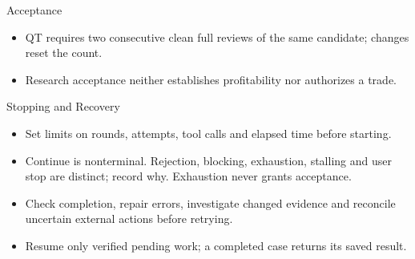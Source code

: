 \begin{frame}{Acceptance}
\begin{center}\resizebox{.95\textwidth}{!}{}\end{center}
\begin{itemize}
\item QT requires two consecutive clean full reviews of the same candidate; changes reset the count.
\item Research acceptance neither establishes profitability nor authorizes a trade.
\end{itemize}
\end{frame}
\begin{frame}{Stopping and Recovery}
\setlength{\topsep}{0pt}
\begin{center}\resizebox{.90\textwidth}{!}{}\end{center}
\begin{itemize}
\item Set limits on rounds, attempts, tool calls and elapsed time before starting.
\item Continue is nonterminal. Rejection, blocking, exhaustion, stalling and user stop are distinct; record why. Exhaustion never grants acceptance.
\item Check completion, repair errors, investigate changed evidence and reconcile uncertain external actions before retrying.
\item Resume only verified pending work; a completed case returns its saved result.
\end{itemize}
\end{frame}
